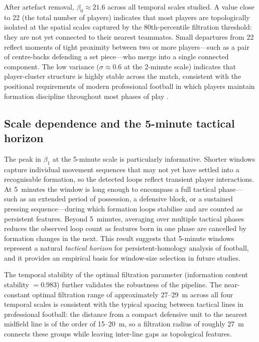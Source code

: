 \documentclass[11pt,a4paper]{article}
\begin{document}
After artefact removal, \(\beta_0 \approx 21.6\) across all
temporal scales studied.  A value close to 22 (the total
number of players) indicates that most players are
topologically isolated at the spatial scales captured by the
80th-percentile filtration threshold: they are not yet
connected to their nearest teammates.  Small departures from
22 reflect moments of tight proximity between two or more
players---such as a pair of centre-backs defending a set
piece---who merge into a single connected component.  The
low variance (\(\sigma \approx 0.6\) at the 2-minute scale)
indicates that player-cluster structure is highly stable
across the match, consistent with the positional
requirements of modern professional football in which
players maintain formation discipline throughout most
phases of play \citep{DiSalvo2007,Bradley2009}.

\subsection{Scale dependence and the 5-minute tactical
            horizon}

The peak in \(\beta_1\) at the 5-minute scale is
particularly informative.  Shorter windows capture
individual movement sequences that may not yet have settled
into a recognisable formation, so the detected loops
reflect transient player interactions.  At 5~minutes the
window is long enough to encompass a full tactical phase---
such as an extended period of possession, a defensive block,
or a sustained pressing sequence---during which formation
loops stabilise and are counted as persistent features.
Beyond 5~minutes, averaging over multiple tactical phases
reduces the observed loop count as features born in one
phase are cancelled by formation changes in the next.
This result suggests that 5-minute windows represent a
natural \emph{tactical horizon} for persistent-homology
analysis of football, and it provides an empirical basis
for window-size selection in future studies.

The temporal stability of the optimal filtration parameter
(information content stability \(= 0.983\)) further
validates the robustness of the pipeline.  The near-constant
optimal filtration range of approximately 27--29~m across
all four temporal scales is consistent with the typical
spacing between tactical lines in professional football:
the distance from a compact defensive unit to the nearest
midfield line is of the order of 15--20~m, so a filtration
radius of roughly 27~m connects these groups while leaving
inter-line gaps as topological features.
\end{document}
